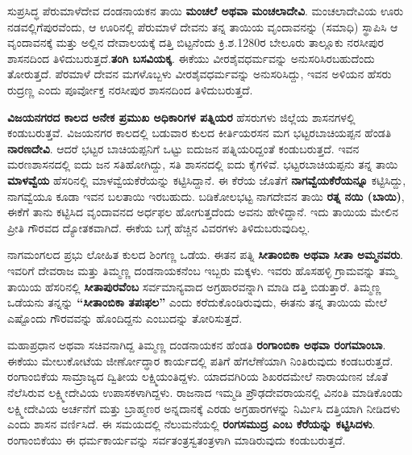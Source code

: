 ಸುಪ್ರಸಿದ್ಧ ಪೆರುಮಾಳೆದೇವ ದಂಡನಾಯಕನ ತಾಯಿ \textbf{ಮಂಚಲೆ ಅಥವಾ ಮಂಚಲಾದೇವಿ}. ಮಂಚಲಾದೇವಿಯ ಊರು ನಡವಲ್ಲಿಗೆಪುರವೆಂದು, ಆ ಊರಿನಲ್ಲಿ ಪೆರುಮಾಳೆ ದೇವನು ತನ್ನ ತಾಯಿಯ ವೃಂದಾವನನ್ನು (ಸಮಾಧಿ) ಸ್ಥಾಪಿಸಿ ಆ ವೃಂದಾವನಕ್ಕೆ ಮತ್ತು ಅಲ್ಲಿನ ದೇವಾಲಯಕ್ಕೆ ದತ್ತಿ ಬಿಟ್ಟನೆಂದು ಕ್ರಿ.ಶ.1280ರ ಬೇಲೂರು ತಾಲ್ಲೂಕು ನರಸೀಪುರ ಶಾಸನದಿಂದ ತಿಳಿದುಬರುತ್ತದೆ.\textbf{ತಂಗಿ ಬಸವಿಯಕ್ಕ}. ಈಕೆಯು ವೀರಶೈವಧರ್ಮವನ್ನು ಅನುಸರಿಸಿರಬಹುದೆಂದು ತೋರುತ್ತದೆ. ಪೆರಮಾಳೆ ದೇವನ ಮಗಳೊಬ್ಬಳು ವೀರಶೈವಧರ್ಮವನ್ನು ಅನುಸರಿಸಿದ್ದು, ಇವನ ಅಳಿಯನ ಹೆಸರು ರುದ್ರಣ್ಣ ಎಂದು ಪೂರ್ವೋಕ್ತ ನರಸೀಪುರ ಶಾಸನದಿಂದ ತಿಳಿದುಬರುತ್ತದೆ.

\vskip 2pt

\textbf{ವಿಜಯನಗರದ ಕಾಲದ ಅನೇಕ ಪ್ರಮುಖ ಅಧಿಕಾರಿಗಳ ಪತ್ನಿಯರ} ಹೆಸರುಗಳು ಜಿಲ್ಲೆಯ ಶಾಸನಗಳಲ್ಲಿ ಕಂಡು\-ಬರುತ್ತವೆ. ವಿಜಯನಗರ ಕಾಲದಲ್ಲಿ ಬಡುವಾರ ಕುಲದ ಕೀರ್ತಿಯರಸನ ಮಗ ಭಟ್ಟರಬಾಚಿಯಪ್ಪನ ಹೆಂಡತಿ \textbf{ನಾರಣದೇವಿ}. ಆದರೆ ಭಟ್ಟರ ಬಾಚಿಯಪ್ಪನಿಗೆ ಒಟ್ಟು ಐದುಜನ ಪತ್ನಿಯರಿದ್ದಂತೆ ಕಂಡುಬರುತ್ತದೆ. ಇವನ ಮರಣಶಾಸನದಲ್ಲಿ ಐದು ಜನ ಸತಿಹೋಗಿದ್ದು, ಸತಿ ಶಾಸನದಲ್ಲಿ ಐದು ಕೈಗಳಿವೆ. ಭಟ್ಟರಬಾಚಿಯಪ್ಪನು ತನ್ನ ತಾಯಿ \textbf{ಮಾಳವ್ವೆಯ} ಹೆಸರಿನಲ್ಲಿ ಮಾಳವ್ವೆಯಕೆರೆಯನ್ನು ಕಟ್ಟಿಸಿದ್ದಾನೆ. ಈ ಕೆರೆಯ ಜೊತೆಗೆ \textbf{ನಾಗವ್ವೆಯಕೆರೆಯನ್ನೂ} ಕಟ್ಟಿಸಿದ್ದು, ನಾಗವ್ವೆಯೂ ಕೂಡಾ ಇವನ ಬಲತಾಯಿ ಇರಬಹುದು. ಬಡಿಕೋಲಭಟ್ಟ ನಾಗದೇವನ ತಾಯಿ \textbf{ರತ್ನ ನಯಿ (ಬಾಯಿ)}, ಈಕೆಗೆ ತಾನು ಕಟ್ಟಿಸಿದ ವೃಂದಾವನದ ಅರ್ಧಫಲ ಹೋಗುತ್ತದೆಂದು ಅವನು ಹೇಳಿದ್ದಾನೆ. ಇದು ತಾಯಿಯ ಮೇಲಿನ ಪ್ರೀತಿ ಗೌರವದ ದ್ಯೋತಕವಾಗಿದೆ. ಈಕೆಯ ಬಗ್ಗೆ ಹೆಚ್ಚಿನ ವಿವರಗಳು ತಿಳಿದುಬರುವುದಿಲ್ಲ.

\vskip 2pt

ನಾಗಮಂಗಲದ ಪ್ರಭು ಲೋಹಿತ ಕುಲದ ಶಿಂಗಣ್ಣ ಒಡೆಯ. ಈತನ ಪತ್ನಿ \textbf{ಸೀತಾಂಬಿಕಾ ಅಥವಾ ಸೀತಾ ಅಮ್ಮನವರು}. ಇವರಿಗೆ ದೇವರಾಜ ಮತ್ತು ತಿಮ್ಮಣ್ಣ ದಂಡನಾಯಕನೆಂಬ ಇಬ್ಬರು ಮಕ್ಕಳು. ಇವರು ಹೊಸಹಳ್ಳಿ ಗ್ರಾಮವನ್ನು ತಮ್ಮ ತಾಯಿಯ ಹೆಸರಿನಲ್ಲಿ \textbf{ಸೀತಾಪುರವೆಂಬ} ಸರ್ವಮಾನ್ಯವಾದ ಅಗ್ರಹಾರವನ್ನಾಗಿ ಮಾಡಿ ದತ್ತಿ ಬಿಡುತ್ತಾರೆ. ತಿಮ್ಮಣ್ಣ ಒಡೆಯನು ತನ್ನನ್ನು \textbf{“ಸೀತಾಂಬಿಕಾ ತಪಃಫಲ”} ಎಂದು ಕರೆದುಕೊಂಡಿರುವುದು, ಈತನು ತನ್ನ ತಾಯಿಯ ಮೇಲೆ ಎಷ್ಟೊಂದು ಗೌರವವನ್ನು ಹೊಂದಿದ್ದನು ಎಂಬುದನ್ನು ತೋರಿಸುತ್ತದೆ.

\vskip 2pt

ಮಹಾಪ್ರಧಾನ ಅಥವಾ ಸಚಿವನಾಗಿದ್ದ ತಿಮ್ಮಣ್ಣ ದಂಡನಾಯಕನ ಹೆಂಡತಿ \textbf{ರಂಗಾಂಬಿಕಾ ಅಥವಾ ರಂಗಮಾಂಬಾ}. ಈಕೆಯು ಮೇಲುಕೋಟೆಯ ಜೀರ್ಣೋದ್ಧಾರ ಕಾರ್ಯದಲ್ಲಿ ಪತಿಗೆ ಹೆಗಲೆಣೆಯಾಗಿ ನಿಂತಿರುವುದು ಕಂಡಬರುತ್ತದೆ. ರಂಗಾಂಬಿಕೆಯ ಸಾಮ್ರಾಜ್ಯದ ದ್ವಿತೀಯ ಲಕ್ಷ್ಮಿಯಂತಿದ್ದಳು. ಯಾದವಗಿರಿಯ ಶಿಖರದಮೇಲೆ ನಾರಾಯಣನ ಜೊತೆ ನೆಲೆಸಿರುವ ಲಕ್ಷ್ಮೀದೇವಿಯ ಉಪಾಸಕಳಾಗಿದ್ದಳು. ರಾಜನಾದ ಇಮ್ಮಡಿ ಪ್ರೌಢದೇವರಾಯನಲ್ಲಿ ವಿನಂತಿ ಮಾಡಿಕೊಂಡು ಲಕ್ಷ್ಮೀದೇವಿಯ ಅರ್ಚನೆಗೆ ಮತ್ತು ಬ್ರಾಹ್ಮಣರ ಅನ್ನದಾನಕ್ಕೆ ಎರಡು ಅಗ್ರಹಾರಗಳನ್ನು ನಿರ್ಮಿಸಿ ದತ್ತಿಯಾಗಿ ನೀಡಿದಳು ಎಂದು ಶಾಸನ ವರ್ಣಿಸಿದೆ. ಈ ಸಮಯದಲ್ಲಿ ನೆಲುಮನೆಯಲ್ಲಿ \textbf{ರಂಗಸಮುದ್ರ ಎಂಬ ಕೆರೆಯನ್ನು ಕಟ್ಟಿಸಿದಳು}. ರಂಗಾಂಬಿಕೆಯು ಈ ಧರ್ಮಕಾರ್ಯವನ್ನು ಸರ್ವತಂತ್ರಸ್ವತಂತ್ರಳಾಗಿ ಮಾಡಿರುವುದು ಕಂಡುಬರುತ್ತದೆ.

